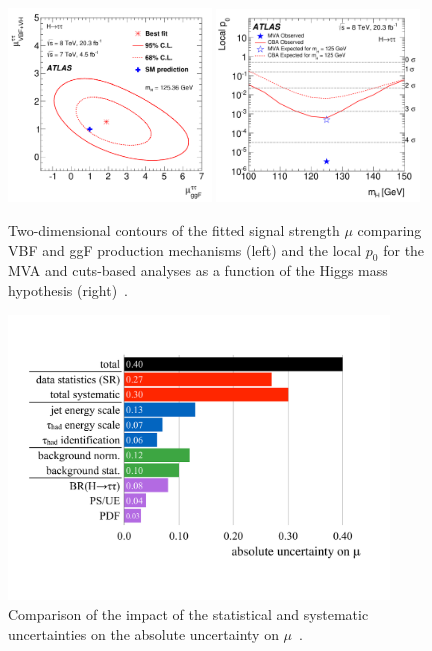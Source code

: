 \begin{figure}[tp]
  \centering
  \includegraphics[width=0.48\textwidth]{figures/HIGG-2013-32/fig_12}
  \includegraphics[width=0.48\textwidth]{figures/HIGG-2013-32/fig_14}
  \caption{Two-dimensional contours of the fitted signal strength $\mu$ comparing VBF and ggF production mechanisms (left) and the local $p_0$ for the MVA and cuts-based analyses as a function of the Higgs mass hypothesis (right)~\cite{HIGG-2013-32}.}
  \label{fig:results-mup0}
\end{figure}

\begin{figure}[tp]
  \centering
  \includegraphics[width=0.90\textwidth]{figures/HIGG-2013-32/uncertainties}
  \caption{Comparison of the impact of the statistical and systematic uncertainties on the absolute uncertainty on $\mu$~\cite{HIGG-2013-32}.}
  \label{fig:results-uncertainties-1}
\end{figure}

